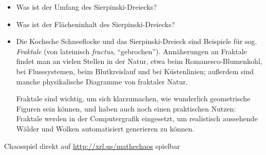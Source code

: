 \documentclass[a4paper,ngerman]{scrartcl}
\begin{document}
\begin{minipage}{0.9\textwidth}
\begin{itemize}
  \begin{center}
  \end{center}
  \item Was ist der Umfang des Sierpinski-Dreiecks?
  \item Was ist der Flächeninhalt des Sierpinski-Dreiecks?
  \item Die Kochsche Schneeflocke und das Sierpinski-Dreieck sind Beispiele für
  sog. \emph{Fraktale} (von lateinisch \emph{fractus}, "`gebrochen"').
  Annäherungen an Fraktale findet man an vielen Stellen in der Natur,
  etwa beim Romanesco-Blumenkohl, bei Flusssystemen, beim Blutkreislauf und bei
  Küstenlinien; außerdem sind manche physikalische Diagramme von fraktaler
  Natur.

  Fraktale sind
  wichtig, um sich klarzumachen, wie wunderlich geometrische Figuren sein
  können, und haben auch noch einen praktischen Nutzen: Fraktale werden
  in der Computergrafik eingesetzt, um realistisch aussehende Wälder und
  Wolken automatisiert
  generieren zu können.
\end{itemize}

\end{minipage}

\vfill
\hfill\small Chaosspiel direkt auf \url{http://xrl.us/mathechaos} spielbar
\end{document}
